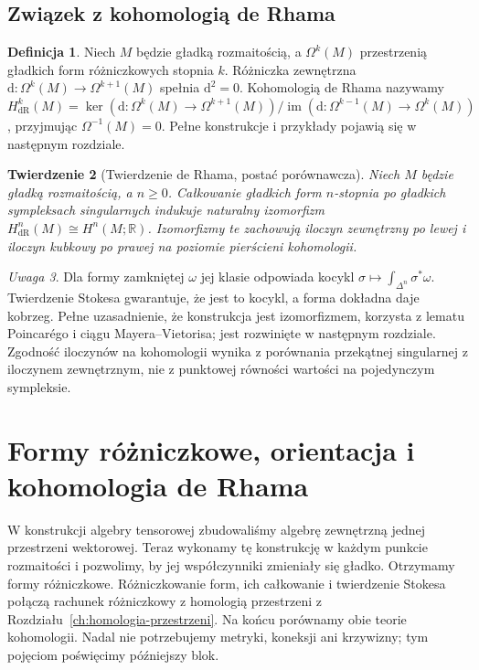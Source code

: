 \documentclass[11pt,a4paper,oneside]{report}
\newcommand{\R}{\mathbb{R}}
\theoremstyle{plain}
\newtheorem{twierdzenie}{Twierdzenie}[section]
\theoremstyle{definition}
\newtheorem{definicja}[twierdzenie]{Definicja}
\theoremstyle{remark}
\newtheorem{uwaga}[twierdzenie]{Uwaga}
\begin{document}
\section{Związek z kohomologią de Rhama}

\begin{definicja}
Niech $M$ będzie gładką rozmaitością, a $\Omega^k(M)$ przestrzenią
gładkich form różniczkowych stopnia $k$. Różniczka zewnętrzna
$\mathrm d:\Omega^k(M)\to\Omega^{k+1}(M)$ spełnia $\mathrm d^2=0$.
Kohomologią de Rhama nazywamy
$H^k_{\mathrm{dR}}(M)=\ker(\mathrm d:\Omega^k(M)\to\Omega^{k+1}(M))
/\operatorname{im}(\mathrm d:\Omega^{k-1}(M)\to\Omega^k(M))$,
przyjmując $\Omega^{-1}(M)=0$. Pełne konstrukcje i przykłady
pojawią się w następnym rozdziale.
\end{definicja}

\begin{twierdzenie}[Twierdzenie de Rhama, postać porównawcza]
Niech $M$ będzie gładką rozmaitością, a $n\geq0$. Całkowanie
gładkich form $n$-stopnia po gładkich sympleksach singularnych
indukuje naturalny izomorfizm
$H^n_{\mathrm{dR}}(M)\cong H^n(M;\R)$.
Izomorfizmy te zachowują iloczyn zewnętrzny po lewej i iloczyn
kubkowy po prawej na poziomie pierścieni kohomologii.
\end{twierdzenie}

\begin{uwaga}
Dla formy zamkniętej $\omega$ jej klasie odpowiada kocykl
$\sigma\mapsto\int_{\Delta^n}\sigma^*\omega$.
Twierdzenie Stokesa gwarantuje, że jest to kocykl,
a forma dokładna daje kobrzeg. Pełne uzasadnienie, że
konstrukcja jest izomorfizmem, korzysta z lematu Poincarégo
i ciągu Mayera--Vietorisa; jest rozwinięte w następnym
rozdziale. Zgodność iloczynów na kohomologii wynika z
porównania przekątnej singularnej z iloczynem zewnętrznym,
nie z punktowej równości wartości na pojedynczym sympleksie.
\end{uwaga}

\chapter{Formy różniczkowe, orientacja i kohomologia de Rhama}
\label{ch:formy-de-rham}

W konstrukcji algebry tensorowej zbudowaliśmy algebrę
zewnętrzną jednej przestrzeni wektorowej. Teraz wykonamy tę
konstrukcję w każdym punkcie rozmaitości i pozwolimy, by jej
współczynniki zmieniały się gładko. Otrzymamy formy różniczkowe.
Różniczkowanie form, ich całkowanie i twierdzenie Stokesa
połączą rachunek różniczkowy z homologią przestrzeni z
Rozdziału~\ref{ch:homologia-przestrzeni}. Na końcu porównamy
obie teorie kohomologii. Nadal nie potrzebujemy metryki,
koneksji ani krzywizny; tym pojęciom poświęcimy późniejszy blok.
\end{document}
